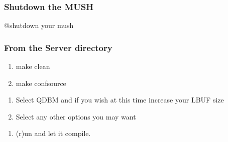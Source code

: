 \documentclass[letterpaper,10pt,english]{sphinxmanual}
\begin{document}
\subsubsection{Shutdown the MUSH}
\label{\detokenize{legacy:shutdown-the-mush}}
\sphinxAtStartPar
@shutdown your mush


\subsubsection{From the Server directory}
\label{\detokenize{legacy:from-the-server-directory}}\begin{enumerate}
%
\item {} 
\sphinxAtStartPar
make clean

\item {} 
\sphinxAtStartPar
make confsource

\end{enumerate}
\begin{enumerate}
%
\item {} 
\sphinxAtStartPar
Select QDBM and if you wish at this time increase your LBUF size

\item {} 
\sphinxAtStartPar
Select any other options you may want

\end{enumerate}
\begin{enumerate}
%
\item {} 
\sphinxAtStartPar
(r)un and let it compile.

\end{enumerate}
\end{document}
